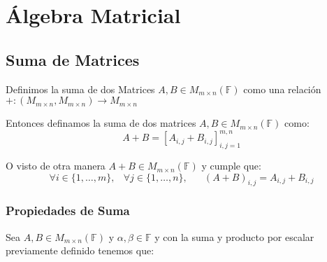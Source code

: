 \documentclass[12pt]{report}                                    %
\DeclareMathOperator \Space {\quad}                             %
\DeclareMathOperator \MiniSpace {\;}                            %
\begin{document}
    \clearpage
    \chapter{Álgebra Matricial}

        \clearpage
        \section{Suma de Matrices}

            Definimos la suma de dos Matrices $A, B \in M_{m \times n}(\mathbb{F})$ como una relación 
            \\ $+: (M_{m \times n}, M_{m \times n}) \to M_{m \times n}$

            Entonces definamos la suma de dos matrices $A, B \in M_{m \times n}(\mathbb{F})$ como:
            \begin{equation}
                A + B = [A_{i, j} + B_{i, j}]_{i, j = 1}^{m, n}
            \end{equation}

            O visto de otra manera $A + B \in M_{m \times n}(\mathbb{F})$ y cumple que:
            \begin{equation}
                \forall i \in \{1, \dots, m\} ,\MiniSpace
                    \forall j \in \{1, \dots, n\} ,\Space
                        (A+B)_{i, j} = A_{i, j} + B_{i, j}
            \end{equation}


            \subsection{Propiedades de Suma}

                Sea $A, B \in M_{m \times n}(\mathbb{F})$ y $\alpha, \beta \in \mathbb{F}$
                y con la suma y producto por escalar previamente definido tenemos que:
\end{document}
